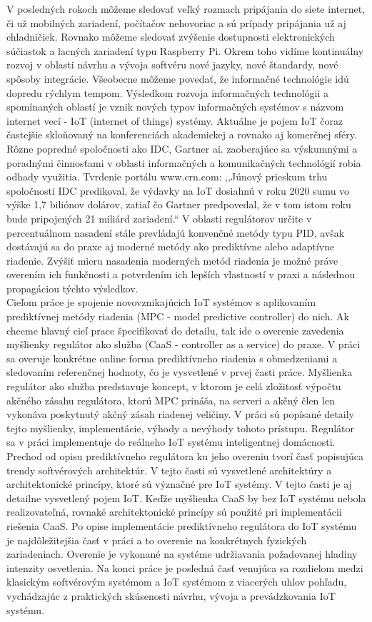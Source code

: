 \indent V posledných rokoch môžeme sledovať veľký rozmach pripájania do siete internet, či už mobilných zariadení, počítačov nehovoriac a sú prípady pripájania už aj chladničiek. Rovnako môžeme sledovať zvýšenie dostupnosti elektronických súčiastok a lacných zariadení typu Raspberry Pi. Okrem toho vidíme kontinuálny rozvoj v oblasti návrhu a vývoja softvéru nové jazyky, nové štandardy, nové spôsoby integrácie. Všeobecne môžeme povedať, že informačné technológie idú dopredu rýchlym tempom. Výsledkom rozvoja informačných technológii a spomínaných oblastí je vznik nových typov informačných systémov s názvom internet vecí - IoT (internet of things) systémy. Aktuálne je pojem IoT čoraz častejšie skloňovaný na konferenciách akademickej a rovnako aj komerčnej sféry. Rôzne popredné spoločnosti ako IDC, Gartner ai. zaoberajúce sa výskumnými a poradnými činnosťami v oblasti informačných a komunikačných technológií robia odhady využitia. Tvrdenie portálu www.crn.com:
,,Júnový prieskum trhu spoločnosti IDC predikoval, že výdavky na IoT dosiahnú v roku 2020 sumu vo výške 1,7 biliónov dolárov, zatiaľ čo Gartner predpovedal, že v tom istom roku bude pripojených 21 miliárd zariadení.``\cite{IOT01} V oblasti regulátorov určite v percentuálnom nasadení stále prevládajú konvenčné metódy typu PID, avšak dostávajú sa do praxe aj moderné metódy ako prediktívne alebo adaptívne riadenie. Zvýšiť mieru nasadenia moderných metód riadenia je možné práve overením ich funkčnosti a potvrdením ich lepších vlastností v praxi a následnou propagáciou týchto výsledkov.\\
\indent Cieľom práce je spojenie novovznikajúcich IoT systémov s aplikovaním prediktívnej metódy riadenia (MPC - model predictive controller) do nich. Ak chceme hlavný cieľ prace špecifikovať do detailu, tak ide o overenie zavedenia myšlienky regulátor ako služba (CaaS - controller as a service) do praxe. V práci sa overuje konkrétne online forma prediktívneho riadenia s obmedzeniami a sledovaním referenčnej hodnoty, čo je vysvetlené v prvej časti práce. Myšlienka regulátor ako služba predstavuje koncept, v ktorom je celá zložitosť výpočtu akčného zásahu regulátora, ktorú MPC prináša, na serveri a akčný člen len vykonáva poskytnutý akčný zásah riadenej veličiny. V práci sú popísané detaily tejto myšlienky, implementácie, výhody a nevýhody tohoto prístupu. Regulátor sa v práci implementuje do reálneho IoT systému inteligentnej domácnosti. Prechod od opisu prediktívneho regulátora ku jeho overeniu tvorí časť popisujúca trendy softvérových architektúr. V tejto časti sú vysvetlené architektúry a architektonické princípy, ktoré sú význačné pre IoT systémy. V tejto časti je aj detailne vysvetlený pojem IoT. Keďže myšlienka CaaS by bez IoT systému nebola realizovateľná, rovnaké architektonické princípy sú použité  pri implementácii riešenia CaaS. Po opise implementácie prediktívneho regulátora do IoT systému je najdôležitejšia časť v práci a to overenie na konkrétnych fyzických zariadeniach. Overenie je vykonané na systéme udržiavania požadovanej hladiny intenzity osvetlenia. Na konci práce je posledná časť venujúca sa rozdielom medzi klasickým softvérovým systémom a IoT systémom z viacerých uhlov pohľadu, vychádzajúc z praktických skúsenosti návrhu, vývoja a prevádzkovania IoT systému.